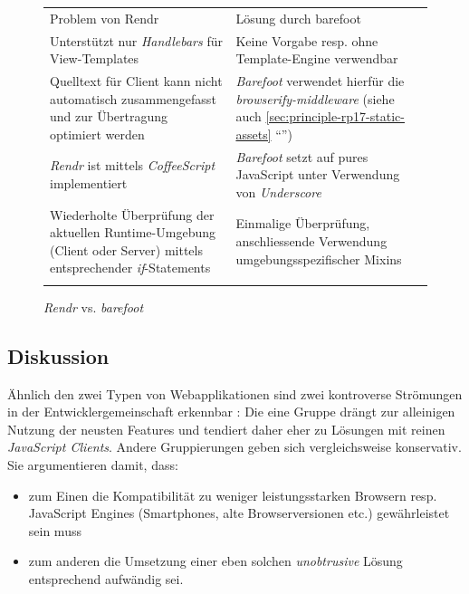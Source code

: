 \begin{figure}[H]
	\begin{table}[H]
		\tablestyle
		\tablealtcolored
		\begin{tabularx}{\textwidth}{X X}
			\tableheadcolor
				\tablehead Problem von Rendr &
				\tablehead Lösung durch barefoot
				\tabularnewline
			\tablebody
				Unterstützt nur \emph{Handlebars} \cite{Handlebars} für View-Templates &
				Keine Vorgabe resp. ohne Template-Engine verwendbar
				\tabularnewline

				Quelltext für Client kann nicht automatisch zusammengefasst und zur Übertragung optimiert werden &
				\emph{Barefoot} verwendet hierfür die \emph{browserify-middleware} (siehe auch \ref{sec:principle-rp17-static-assets} ``\nameref{sec:principle-rp17-static-assets}'')
				\tabularnewline

				\emph{Rendr} ist mittels \emph{CoffeeScript} \cite{CoffeeScript} implementiert &
				\emph{Barefoot} setzt auf pures JavaScript unter Verwendung von \emph{Underscore} \cite{Underscore}
				\tabularnewline

				Wiederholte Überprüfung der aktuellen Runtime-Umgebung (Client oder Server) mittels entsprechender \emph{if}-Statements &
				Einmalige Überprüfung, anschliessende Verwendung umgebungsspezifischer \gls{Mixin}s
				\tabularnewline
			\tableend
		\end{tabularx}
	\end{table}
	\caption{\emph{Rendr} vs. \emph{barefoot}}
	\label{tab:rendr-vs-barefoot}
\end{figure}


\subsection*{Diskussion}

Ähnlich den zwei Typen von Webapplikationen sind zwei kontroverse Strömungen in der Entwicklergemeinschaft erkennbar \cite{StackOverflowUnobtrusiveJavascriptOutdated}: Die eine Gruppe drängt zur alleinigen Nutzung der neusten Features und tendiert daher eher zu Lösungen mit reinen \emph{JavaScript Clients}. Andere Gruppierungen geben sich vergleichsweise konservativ. Sie argumentieren damit, dass:

\begin{itemize}
	\item zum Einen die Kompatibilität zu weniger leistungsstarken Browsern resp. JavaScript Engines (Smartphones, alte Browserversionen etc.) gewährleistet sein muss
	\item zum anderen die Umsetzung einer eben solchen \emph{unobtrusive} Lösung entsprechend aufwändig sei.
\end{itemize}

